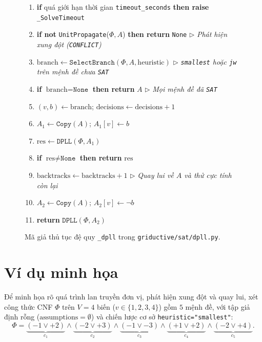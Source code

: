 \begin{figure}[!htbp]
\centering
\begin{tcolorbox}[
    colback=docs_lightgray,
    colframe=central_blue,
    boxrule=0.8pt,
    arc=2pt,
    left=8pt,
    right=8pt,
    top=6pt,
    bottom=6pt,
    title={\textbf{Thuật toán: Thủ tục \texttt{DPLL}($\Phi, A$) với lan truyền đơn vị và quay lui}},
    fonttitle=\bfseries\small,
    coltitle=white
]
\small\linespread{1.2}\selectfont
\begin{enumerate}[label=\textbf{\arabic*.}, leftmargin=1.8em, itemsep=1.5pt]
    \item \textbf{if} quá giới hạn thời gian \texttt{timeout\_seconds} \textbf{then raise} \texttt{\_SolveTimeout}
    \item \textbf{if not} \texttt{UnitPropagate}($\Phi, A$) \textbf{then return} \texttt{None} \hfill $\triangleright$ \textit{Phát hiện xung đột (\texttt{CONFLICT})}
    \item $\text{branch} \gets \texttt{SelectBranch}(\Phi, A, \text{heuristic})$ \hfill $\triangleright$ \textit{\texttt{smallest} hoặc \texttt{jw} trên mệnh đề chưa \texttt{SAT}}
    \item \textbf{if} $\text{branch} = \texttt{None}$ \textbf{then return} $A$ \hfill $\triangleright$ \textit{Mọi mệnh đề đã \texttt{SAT}}
    \item $(v, b) \gets \text{branch}$; \quad $\text{decisions} \gets \text{decisions} + 1$
    \item $A_1 \gets \texttt{Copy}(A)$; \quad $A_1[v] \gets b$
    \item $\text{res} \gets \texttt{DPLL}(\Phi, A_1)$
    \item \textbf{if} $\text{res} \neq \texttt{None}$ \textbf{then return} $\text{res}$
    \item $\text{backtracks} \gets \text{backtracks} + 1$ \hfill $\triangleright$ \textit{Quay lui về $A$ và thử cực tính còn lại}
    \item $A_2 \gets \texttt{Copy}(A)$; \quad $A_2[v] \gets \neg b$
    \item \textbf{return} $\texttt{DPLL}(\Phi, A_2)$
\end{enumerate}
\end{tcolorbox}
\caption{Mã giả thủ tục đệ quy \texttt{\_dpll} trong \texttt{griductive/sat/dpll.py}.}
\label{fig:dpll_pseudocode}
\end{figure}

\section{Ví dụ minh họa}
Để minh họa rõ quá trình lan truyền đơn vị, phát hiện xung đột và quay lui, xét công thức CNF $\Phi$ trên $V = 4$ biến ($v \in \{1, 2, 3, 4\}$) gồm $5$ mệnh đề, với tập giả định rỗng ($\text{assumptions} = \emptyset$) và chiến lược cơ sở \texttt{heuristic="smallest"}:
\begin{equation}
    \Phi = \underbrace{(-1 \lor +2)}_{c_1} \land \underbrace{(-2 \lor +3)}_{c_2} \land \underbrace{(-1 \lor -3)}_{c_3} \land \underbrace{(+1 \lor +2)}_{c_4} \land \underbrace{(-2 \lor +4)}_{c_5}.
\end{equation}

